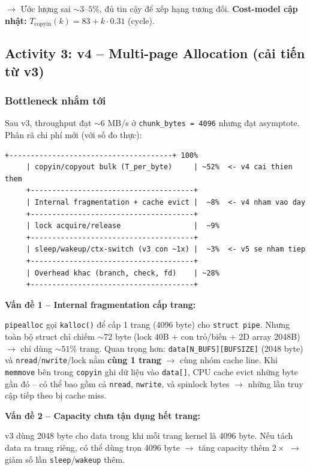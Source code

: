 \documentclass[11pt,a4paper]{article}
\begin{document}
$\rightarrow$ Ước lượng sai $\sim 3$--$5\%$, đủ tin cậy để xếp hạng tương đối. \textbf{Cost-model cập nhật:} $T_{\text{copyin}}(k) = 83 + k \cdot 0.31$ (cycle).

\subsection{Activity 3: v4 -- Multi-page Allocation (cải tiến từ v3)}

\subsubsection{Bottleneck nhắm tới}

Sau v3, throughput đạt $\sim 6$ MB/s ở \texttt{chunk\_bytes = 4096} nhưng đạt asymptote. Phân rã chi phí mới (với số đo thực):

\begin{lstlisting}[style=plain]
     +--------------------------------------+ 100%
     | copyin/copyout bulk (T_per_byte)     | ~52%  <- v4 cai thien them
     +--------------------------------------+
     | Internal fragmentation + cache evict |  ~8%  <- v4 nham vao day
     +--------------------------------------+
     | lock acquire/release                 |  ~9%
     +--------------------------------------+
     | sleep/wakeup/ctx-switch (v3 con ~1x) |  ~3%  <- v5 se nham tiep
     +--------------------------------------+
     | Overhead khac (branch, check, fd)    | ~28%
     +--------------------------------------+
\end{lstlisting}

\textbf{Vấn đề 1 -- Internal fragmentation cấp trang:}

\texttt{pipealloc} gọi \texttt{kalloc()} để cấp 1 trang (4096 byte) cho \texttt{struct pipe}. Nhưng toàn bộ struct chỉ chiếm $\sim 72$ byte (lock 40B + con trỏ/biến + 2D array 2048B) $\rightarrow$ chỉ dùng $\sim 51\%$ trang. Quan trọng hơn: \texttt{data[N\_BUFS][BUFSIZE]} (2048 byte) và \texttt{nread}/\texttt{nwrite}/lock nằm \textbf{cùng 1 trang} $\rightarrow$ cùng nhóm cache line. Khi \texttt{memmove} bên trong \texttt{copyin} ghi dữ liệu vào \texttt{data[]}, CPU cache evict những byte gần đó -- có thể bao gồm cả \texttt{nread}, \texttt{nwrite}, và spinlock bytes $\rightarrow$ những lần truy cập tiếp theo bị cache miss.

\textbf{Vấn đề 2 -- Capacity chưa tận dụng hết trang:}

v3 dùng 2048 byte cho data trong khi mỗi trang kernel là 4096 byte. Nếu tách data ra trang riêng, có thể dùng trọn 4096 byte $\rightarrow$ tăng capacity thêm $2\times$ $\rightarrow$ giảm số lần \texttt{sleep}/\texttt{wakeup} thêm.
\end{document}
